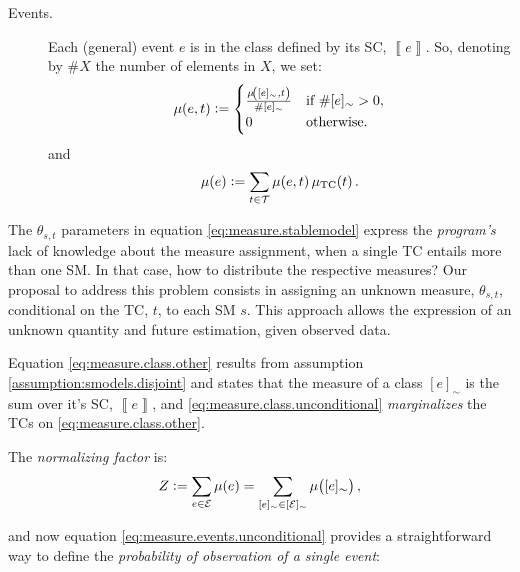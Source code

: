 \documentclass[adraft,copyright,creativecommons]{eptcs}
\newcommand{\at}[1]{\ensuremath{\!\del{#1}}}
\newcommand{\fml}[1]{\ensuremath{{\cal #1}}}
\newcommand{\stablecore}[1]{\ensuremath{\left\llbracket #1 \right\rrbracket}}
\newcommand{\pw}[1]{\ensuremath{\mu\at{#1}}}
\newcommand{\pwcfname}{\ensuremath{\mu_{\textrm{TC}}}}
\newcommand{\pwc}[1]{\ensuremath{\pwcfname\at{#1}}}
\newcommand{\class}[1]{\ensuremath{[{#1}]_{\sim}}}
\newcommand{\indepclass}{\ensuremath{\Diamond}}
\begin{document}
\begin{description}
    \item[Events.] \label{item:event.cases} Each (general) event $e$ is in the class defined by its \acl{SC}, $\stablecore{e}$. So, denoting by $\# X$ the number of elements in $X$, we set:
          \begin{equation}
              \pw{e, t} :=
              \begin{cases}
                  \frac{\pw{\class{e}, t}}{\# \class{e}} & \text{if~}\# \class{e} > 0, \\
                  0                                      & \text{otherwise}.
              \end{cases}
              \label{eq:measure.events}
          \end{equation}
          and
          \begin{equation}
              \pw{e} := \sum_{t\in\fml{T}} \pw{e, t} \pwc{t}.
              \label{eq:measure.events.unconditional}
          \end{equation}
\end{description}



The $\theta_{s,t}$ parameters in equation \eqref{eq:measure.stablemodel} express the \emph{program's} lack of knowledge about the measure assignment, when a single \acl{TC} entails more than one \acl{SM}. In that case, how to distribute the respective measures? Our proposal to address this problem consists in assigning an unknown measure, $\theta_{s,t}$, conditional on the \acl{TC}, $t$, to each \acl{SM} $s$. This approach allows the expression of an unknown quantity and future estimation, given observed data.

Equation \eqref{eq:measure.class.other} results from assumption \ref{assumption:smodels.disjoint} and states that the measure of a class $\class{e}$ is the sum over it's \acl{SC}, $\stablecore{e}$, and \eqref{eq:measure.class.unconditional} \emph{marginalizes} the \acp{TC} on \eqref{eq:measure.class.other}.

The \emph{normalizing factor} is:
\begin{equation*}
    Z :=
    \sum_{e \in \fml{E}} \pw{e} =
    \sum_{\class{e} \in \class{\fml{E}}} \pw{\class{e}},
\end{equation*}

and now equation \eqref{eq:measure.events.unconditional} provides a straightforward way to define the \emph{probability of observation of a single event}:
\end{document}
